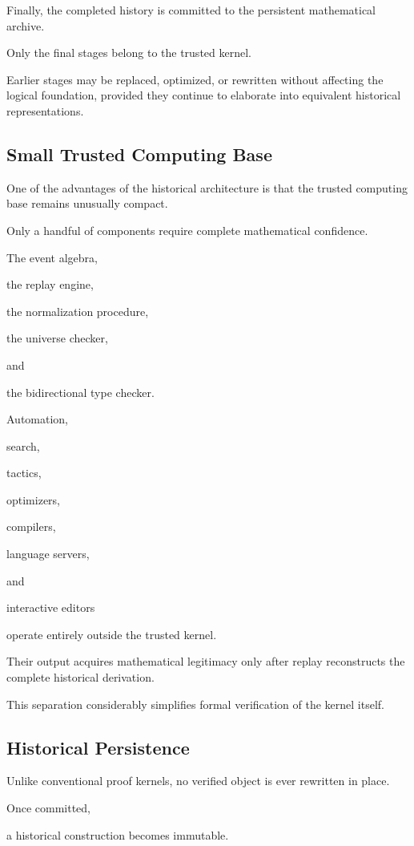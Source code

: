 \documentclass[12pt,oneside]{article}
\theoremstyle{definition}
\theoremstyle{remark}
\begin{document}
Finally, the completed history is committed to the persistent mathematical
archive.

Only the final stages belong to the trusted kernel.

Earlier stages may be replaced, optimized, or rewritten without affecting the
logical foundation, provided they continue to elaborate into equivalent
historical representations.

\subsection{Small Trusted Computing Base}

One of the advantages of the historical architecture is that the trusted
computing base remains unusually compact.

Only a handful of components require complete mathematical confidence.

The event algebra,

the replay engine,

the normalization procedure,

the universe checker,

and

the bidirectional type checker.

Automation,

search,

tactics,

optimizers,

compilers,

language servers,

and

interactive editors

operate entirely outside the trusted kernel.

Their output acquires mathematical legitimacy only after replay reconstructs the
complete historical derivation.

This separation considerably simplifies formal verification of the kernel
itself.

\subsection{Historical Persistence}

Unlike conventional proof kernels, no verified object is ever rewritten in
place.

Once committed,

a historical construction becomes immutable.
\end{document}
